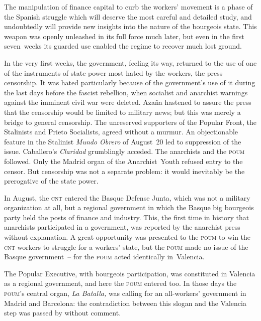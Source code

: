 The manipulation of finance capital to curb the workers’ movement is a phase of the Spanish struggle which will deserve the most careful and detailed study, and undoubtedly will provide new insights into the nature of the bourgeois state. This weapon was openly unleashed in its full force much later, but even in the first seven~weeks its guarded use enabled the regime to recover much lost ground.

In the very first weeks, the government, feeling its way, returned to the use of one of the instruments of state power most hated by the workers, the press censorship. It was hated particularly because of the government’s use of it during the last days before the fascist rebellion, when socialist and anarchist warnings against the imminent civil war were deleted. Azaña hastened to assure the press that the censorship would be limited to military news; but this was merely a bridge to general censorship. The unreserved supporters of the Popular Front, the Stalinists and Prieto Socialists, agreed without a murmur. An objectionable feature in the Stalinist \emph{Mundo Obrero}{\indexMundoObrero} of August~20 led to suppression of the issue. Caballero’s \emph{Claridad}{\indexClaridad} grumblingly acceded. The anarchists and the \textsc{poum} followed. Only the Madrid organ of the Anarchist~Youth refused entry to the censor. But censorship was not a separate problem: it would inevitably be the prerogative of the state power.

In August, the \textsc{cnt}{\indexCNT} entered the Basque Defense Junta, which was not a military organization at all, but a regional government in which the Basque big bourgeois party held the posts of finance and industry. This, the first time in history that anarchists participated in a government, was reported by the anarchist press without explanation. A great opportunity was presented to the \textsc{poum} to win the \textsc{cnt} workers to struggle for a workers’ state, but the \textsc{poum} made no issue of the Basque government~-- for the \textsc{poum} acted identically in~Valencia.
\nowidow

The Popular Executive, with bourgeois participation, was constituted in Valencia as a regional government, and here the \textsc{poum} entered too. In those days the \textsc{poum}’s central organ, \emph{La Batalla,}{\indexLaBatalla} was calling for an all-workers’ government in Madrid and Barcelona: the contradiction between this slogan and the Valencia step was passed by without comment.

